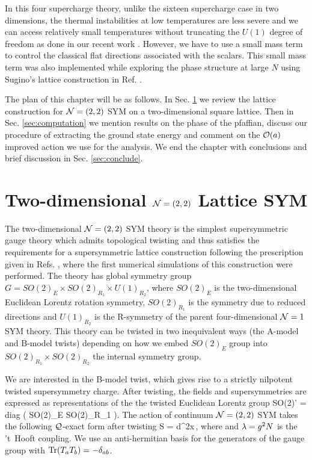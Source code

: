 In this four supercharge theory, unlike the sixteen supercharge case in two dimensions, the thermal instabilities at low temperatures are less severe and we can access relatively small temperatures without truncating the $U(1)$ degree of freedom as done in our recent work \cite{Catterall:2017lub, Jha:2017zad}. However, we have to use a small mass term to control the classical flat directions associated with the scalars. This small mass term was also implemented while exploring the phase structure at large $N$ using Sugino's lattice construction in Ref. \cite{Hanada:2009hq}. 

The plan of this chapter will be as follows. In Sec. \ref{sec:theory} we review the lattice construction for $\mathcal N = (2, 2)$ SYM on a two-dimensional square lattice. Then in Sec. \ref{sec:computation} we mention results on the phase of the pfaffian, discuss our procedure of extracting the ground state energy and comment on the $\mathcal O(a)$ improved action we use for the analysis. We end the chapter with conclusions and brief discussion in Sec. \ref{sec:conclude}.

\section{Two-dimensional $\mathcal N = (2, 2)$ Lattice SYM}
\label{sec:theory}

The two-dimensional $\mathcal N = (2, 2) $ SYM theory is the simplest supersymmetric gauge theory which admits topological twisting \cite{Witten:1988ze} and thus satisfies the requirements for a supersymmetric lattice construction following the prescription given in Refs. \cite{Catterall:2004np, Catterall:2006jw}, where the first numerical simulations of this construction were performed. The theory has global symmetry group $G = SO(2)_E \times SO(2)_{R_1} \times U(1)_{R_2}$, where $SO(2)_E$ is the two-dimensional Euclidean Lorentz rotation symmetry, $SO(2)_{R_1}$ is the symmetry due to reduced directions and $U(1)_{R_2}$ is the R-symmetry of the parent four-dimensional $\mathcal N =1$ SYM theory. This theory can be twisted in two inequivalent ways (the A-model and B-model twists) depending on how we embed $SO(2)_E$ group into $SO(2)_{R_1} \times SO(2)_{R_2}$ the internal symmetry group. 

We are interested in the B-model twist, which gives rise to a strictly nilpotent twisted supersymmetry charge. After twisting, the fields and supersymmetries are expressed as representations of the the twisted Euclidean Lorentz group
\beq
SO(2)' = {\rm diag} \Big( SO(2)_E \times SO(2)_{R_1} \Big).
\eeq 
The action of continuum $\mathcal N = (2, 2)$ SYM takes the following $\mathcal Q$-exact form after twisting
\beq
S =  \cQ \int d^2x\,\Psi,
\label{2daction_twisted}
\eeq
where 
and $\lambda = g^2 N$ is the 't~Hooft coupling. We use an anti-hermitian basis for the generators of the gauge group with $\mathrm{Tr} (T_a T_b)  = - \delta_{ab}$.

